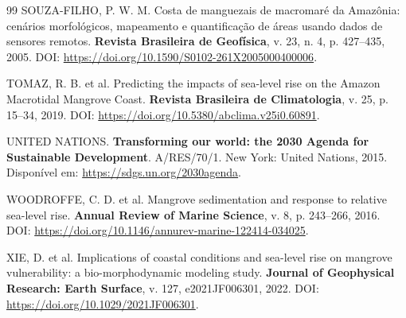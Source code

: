 \documentclass[12pt,a4paper]{article}
\begin{document}
\begin{thebibliography}{99}
SOUZA-FILHO, P. W. M. Costa de manguezais de macromaré da Amazônia: cenários morfológicos, mapeamento e quantificação de áreas usando dados de sensores remotos. \textbf{Revista Brasileira de Geofísica}, v. 23, n. 4, p. 427--435, 2005. DOI: \url{https://doi.org/10.1590/S0102-261X2005000400006}.

TOMAZ, R. B. et al. Predicting the impacts of sea-level rise on the Amazon Macrotidal Mangrove Coast. \textbf{Revista Brasileira de Climatologia}, v. 25, p. 15--34, 2019. DOI: \url{https://doi.org/10.5380/abclima.v25i0.60891}.

UNITED NATIONS. \textbf{Transforming our world: the 2030 Agenda for Sustainable Development}. A/RES/70/1. New York: United Nations, 2015. Disponível em: \url{https://sdgs.un.org/2030agenda}.

WOODROFFE, C. D. et al. Mangrove sedimentation and response to relative sea-level rise. \textbf{Annual Review of Marine Science}, v. 8, p. 243--266, 2016. DOI: \url{https://doi.org/10.1146/annurev-marine-122414-034025}.

XIE, D. et al. Implications of coastal conditions and sea-level rise on mangrove vulnerability: a bio-morphodynamic modeling study. \textbf{Journal of Geophysical Research: Earth Surface}, v. 127, e2021JF006301, 2022. DOI: \url{https://doi.org/10.1029/2021JF006301}.
\end{thebibliography}
\end{document}
